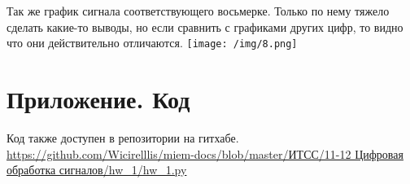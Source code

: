 \documentclass[a4paper,12pt]{article}
\begin{document}
Так же график сигнала соответствующего восьмерке.
Только по нему тяжело сделать какие-то выводы, но если сравнить с графиками других цифр, то видно что они действительно отличаются.
\texttt{[image: /img/8.png]}

\section{Приложение. Код}
Код также доступен в репозитории на гитхабе.
\url{https://github.com/Wicirelllis/miem-docs/blob/master/ИТСС/11-12 Цифровая обработка сигналов/hw_1/hw_1.py}

\inputminted[fontsize=\scriptsize]{python}{hw_1.py}
\end{document}
